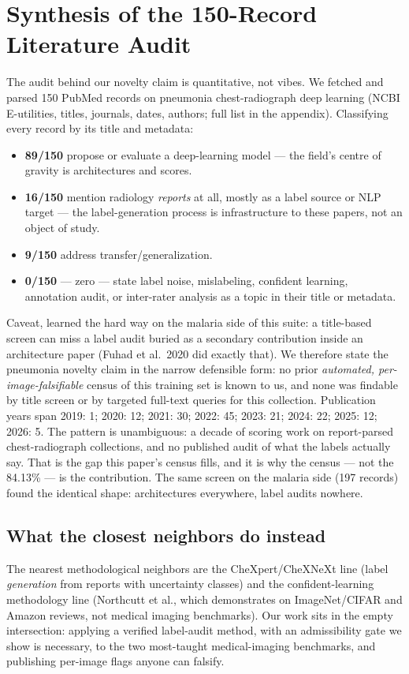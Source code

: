 
\section{Synthesis of the 150-Record Literature Audit}
\label{sec:litsynth}
The audit behind our novelty claim is quantitative, not vibes. We
fetched and parsed 150 PubMed records on pneumonia chest-radiograph deep
learning (NCBI E-utilities, titles, journals, dates, authors; full list
in the appendix). Classifying every record by its title and metadata:
\begin{itemize}
\item \textbf{89/150} propose or evaluate a deep-learning model ---
the field's centre of gravity is architectures and scores.
\item \textbf{16/150} mention radiology \emph{reports} at all, mostly
as a label source or NLP target --- the label-generation process is
infrastructure to these papers, not an object of study.
\item \textbf{9/150} address transfer/generalization.
\item \textbf{0/150} --- zero --- state label noise, mislabeling,
confident learning, annotation audit, or inter-rater analysis as a topic
in their title or metadata.
\end{itemize}
Caveat, learned the hard way on the malaria side of this suite: a
title-based screen can miss a label audit buried as a secondary
contribution inside an architecture paper (Fuhad et al.\ 2020 did
exactly that). We therefore state the pneumonia novelty claim in the
narrow defensible form: no prior \emph{automated, per-image-falsifiable}
census of this training set is known to us, and none was findable by
title screen or by targeted full-text queries for this collection.
Publication years span 2019: 1; 2020: 12; 2021: 30; 2022: 45; 2023: 21; 2024: 22; 2025: 12; 2026: 5. The pattern is unambiguous: a decade of
scoring work on report-parsed chest-radiograph collections, and no
published audit of what the labels actually say. That is the gap this
paper's census fills, and it is why the census --- not the 84.13\%
--- is the contribution. The same screen on the malaria side (197
records) found the identical shape: architectures everywhere, label
audits nowhere.
\subsection{What the closest neighbors do instead}
The nearest methodological neighbors are the CheXpert/CheXNeXt line
(label \emph{generation} from reports with uncertainty classes) and the
confident-learning methodology line (Northcutt et al., which
demonstrates on ImageNet/CIFAR and Amazon reviews, not medical imaging
benchmarks). Our work sits in the empty intersection: applying a
verified label-audit method, with an admissibility gate we show is
necessary, to the two most-taught medical-imaging benchmarks, and
publishing per-image flags anyone can falsify.

